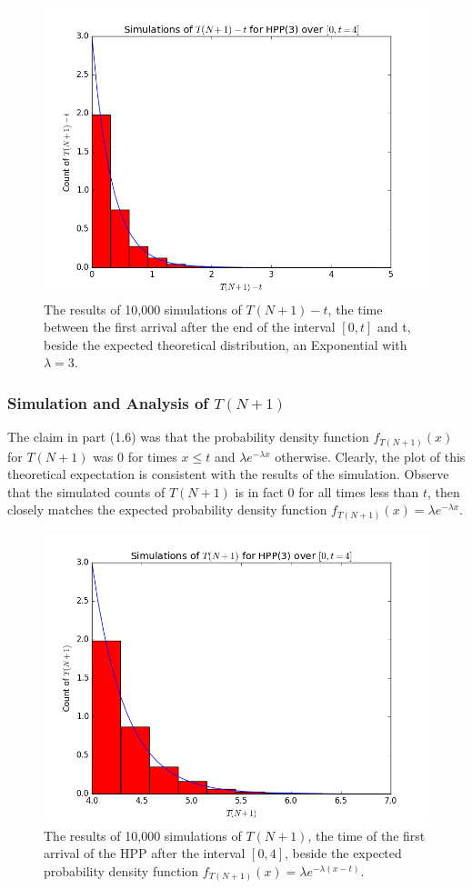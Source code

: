 \documentclass[11pt, oneside]{article}   	%
\begin{document}
\begin{figure}[H]
\includegraphics[scale=.45]{hpp_tn1_t}
\caption{The results of 10,000 simulations of $T(N+1)-t$, the time between the first arrival after the end of the interval $[0,t]$ and t, beside the expected theoretical distribution, an Exponential with $\lambda=3$.}
\label{fig:x}
\end{figure}

\subsubsection{Simulation and Analysis of $T(N+1)$}
The claim in part (1.6) was that the probability density function $f_{T(N+1)}(x)$ for $T(N+1)$ was 0 for times $x \leq t$ and $\lambda e^{-\lambda x}$ otherwise. Clearly, the plot of this theoretical expectation is consistent with the results of the simulation. Observe that the simulated counts of $T(N+1)$ is in fact 0 for all times less than $t$, then closely matches the expected probability density function $f_{T(N+1)}(x)=\lambda e^{-\lambda x}$.
\begin{figure}[H]
\includegraphics[scale=.5]{hpp_tn1}
\caption{The results of 10,000 simulations of $T(N+1)$, the time of the first arrival of the HPP after the interval $[0,4]$, beside the expected probability density function $f_{T(N+1)}(x)=\lambda e^{-\lambda (x - t)}$.}
\label{fig:x}
\end{figure}
\end{document}
